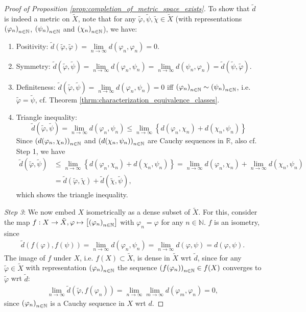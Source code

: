 \begin{proof}[Proof of Proposition \ref{prop:completion_of_metric_space_exists}]
	To show that $\tilde{d}$ is indeed a metric on $\tilde{X}$, note that for any $\tilde{\varphi}, \tilde{\psi}, \tilde{\chi}\in \tilde{X}$ (with representations $\seq[\varphi_n]$, $\seq[\psi_n]$ and $\seq[\chi_n]$), we have:
	\begin{enumerate}
		\item Positivity: $\tilde d\left(\tilde{\varphi}, \tilde{\varphi}\right) = \lim\limits_{n\to\infty} d(\varphi_n, \varphi_n) = 0$.
		\item Symmetry: $\tilde d\left(\tilde{\varphi}, \tilde{\psi}\right) = \lim\limits_{n\to\infty} d(\varphi_n, \psi_n) = \lim\limits_{n\to\infty} d(\psi_n, \varphi_n) = \tilde{d}\left(\tilde{\psi}, \tilde{\varphi}\right)$.
		\item Definiteness: $\tilde d\left(\tilde{\varphi}, \tilde{\psi}\right) = \lim\limits_{n\to\infty}d(\varphi_n, \psi_n) = 0$ iff $\seq[\varphi_n]\sim\seq[\psi_n]$, i.e. $\tilde{\varphi} = \tilde{\psi}$, cf. Theorem \ref{thrm:characterization_equivalence_classes}.
		\item Triangle inequality: $$\tilde{d}\left(\tilde{\varphi}, \tilde{\psi}\right) = \lim\limits_{n\to\infty}d(\varphi_n, \psi_n) \leq \lim\limits_{n\to\infty}\left\{d(\varphi_n, \chi_n) + d(\chi_n, \psi_n)\right\}$$ Since $\seq[d(\varphi_n, \chi_n)]$ and $\seq[d(\chi_n, \psi_n)]$ are Cauchy sequences in $\mathbb R$, also cf. Step 1, we have 
		\begin{align*}
			\tilde{d}\left(\tilde{\varphi}, \tilde{\psi}\right) &\leq \lim\limits_{n\to\infty}\left\{d(\varphi_n, \chi_n) + d(\chi_n, \psi_n)\right\} = \lim\limits_{n\to\infty}d(\varphi_n, \chi_n) + \lim\limits_{n\to\infty}d(\chi_n, \psi_n) 
			\\ &= \tilde{d}\left(\tilde{\varphi}, \tilde{\chi}\right) + \tilde{d}\left(\tilde{\chi}, \tilde{\psi}\right),
		\end{align*}
		which shows the triangle inequality.
	\end{enumerate}
	\textit{Step 3}: We now embed $X$ isometrically as a dense subset of $\tilde{X}$. For this, consider the map $f: X\to\tilde{X}, \varphi\mapsto \left[\seq[\varphi_n]\right]$ with $\varphi_n = \varphi$ for any $n\in\mathbb N$. $f$ is an isometry, since 
	\begin{align}
		\tilde{d}\left(f(\varphi), f(\psi)\right) = \lim\limits_{n\to\infty} d\left(\varphi_n, \psi_n\right) = \lim\limits_{n\to\infty}d(\varphi, \psi) = d(\varphi, \psi).
	\end{align}
	The image of $f$ under $X$, i.e. $f(X)\subset \tilde{X}$, is dense in $\tilde{X}$ wrt $\tilde{d}$, since for any $\tilde{\varphi}\in\tilde{X}$ with representation $\seq[\varphi_n]$ the sequence $\seq[f(\varphi_n)]\in f(X)$ converges to $\tilde{\varphi}$ wrt $\tilde{d}$:
	\begin{align}
		\lim\limits_{n\to\infty}\tilde{d}\left(\tilde{\varphi}, f(\varphi_n)\right) = \lim\limits_{n\to\infty}\lim\limits_{m\to\infty}d(\varphi_m, \varphi_n) = 0,
	\end{align}
	since $\seq[\varphi_n]$ is a Cauchy sequence in $X$ wrt $d$.
	

\end{proof}
